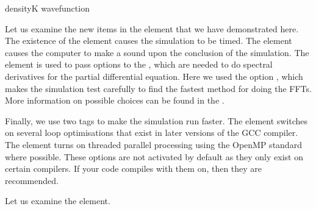 \documentclass[letterpaper,10pt,english]{sphinxmanual}
\begin{document}
\begin{sphinxVerbatim}[commandchars=\\\{\}]
      
      densityK
      wavefunction
      \PYG{c+cp}{\PYGZlt{}![CDATA[}
          
      \PYG{c+cp}{]]\PYGZgt{}}

\end{sphinxVerbatim}

\sphinxAtStartPar
Let us examine the new items in the  element that we have demonstrated here.  The existence of the  element causes the simulation to be timed.  The  element causes the computer to make a sound upon the conclusion of the simulation.  The  element is used to pass options to the , which are needed to do spectral derivatives for the partial differential equation.  Here we used the option , which makes the simulation test carefully to find the fastest method for doing the FFTs.  More information on possible choices can be found in the .

\sphinxAtStartPar
Finally, we use two tags to make the simulation run faster.  The  element switches on several loop optimisations that exist in later versions of the GCC compiler.  The  element turns on threaded parallel processing using the OpenMP standard where possible.  These options are not activated by default as they only exist on certain compilers.  If your code compiles with them on, then they are recommended.

\sphinxAtStartPar
Let us examine the  element.
\end{document}
